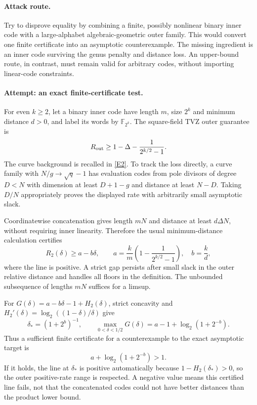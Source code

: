 \documentclass[11pt,a4paper]{article}
\newcommand{\F}{\mathbb{F}}
\newcommand{\eref}[2]{\hyperlink{extra:#1:#2}{[E#2]}}
\numberwithin{equation}{section}
\begin{document}
\paragraph{Attack route.}
Try to disprove equality by combining a finite, possibly nonlinear binary
inner code with a large-alphabet algebraic-geometric outer family. This
would convert one finite certificate into an asymptotic counterexample.
The missing ingredient is an inner code surviving the genus penalty and
distance loss. An upper-bound route, in contrast, must remain valid for
arbitrary codes, without importing linear-code constraints.

\paragraph{Attempt: an exact finite-certificate test.}
For even $k\ge2$, let a binary inner code have length $m$, size $2^k$ and
minimum distance $d>0$, and label its words by $\F_{2^k}$. The square-field
TVZ outer guarantee is
\[
 R_{\rm out}\ge1-\Delta-\frac1{2^{k/2}-1}.
\]
The curve background is recalled in \eref{statement}{2}. To track the loss directly,
a curve family with $N/g\to\sqrt q-1$ has evaluation codes from pole
divisors of degree $D<N$ with dimension at least $D+1-g$ and distance at
least $N-D$. Taking $D/N$ appropriately proves the displayed rate with
arbitrarily small asymptotic slack.

Coordinatewise concatenation gives length $mN$ and distance at least
$d\Delta N$, without requiring inner linearity. Therefore the usual
minimum-distance calculation certifies
\begin{equation}\label{statement:line}
 R_2(\delta)\ge a-b\delta,\qquad
 a=\frac{k}{m}\left(1-\frac1{2^{k/2}-1}\right),\quad b=\frac{k}{d},
\end{equation}
where the line is positive. A strict gap persists after small slack in the
outer relative distance and handles all floors in the definition. The
unbounded subsequence of lengths $mN$ suffices for a limsup.

For $G(\delta)=a-b\delta-1+H_2(\delta)$, strict concavity and
$H_2'(\delta)=\log_2((1-\delta)/\delta)$ give
\begin{equation}\label{statement:test}
 \delta_*=(1+2^b)^{-1},\qquad
 \max_{0<\delta<1/2}G(\delta)=a-1+\log_2(1+2^{-b}).
\end{equation}
Thus a sufficient finite certificate for a counterexample to the exact
asymptotic target is
\[
 \boxed{a+\log_2(1+2^{-b})>1.}
\]
If it holds, the line at $\delta_*$ is positive automatically because
$1-H_2(\delta_*)>0$, so the outer positive-rate range is respected. A
negative value means this certified line fails, not that the concatenated
codes could not have better distances than the product lower bound.
\end{document}
